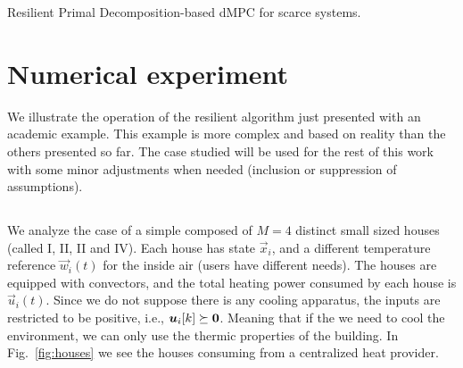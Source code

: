 \documentclass[../main.tex]{subfiles}
\begin{document}
\begin{algorithm2e}[h]
  \DontPrintSemicolon
  \caption{Resilient Primal Decomposition-based dMPC for scarce systems.}\label{alg:rpdbdmpcss}
\end{algorithm2e}

\section{Numerical experiment}\label{sec:numerical-experiment}

We illustrate the operation of the resilient algorithm just presented with an academic example.
This example is more complex and based on reality than the others presented so far.
The case studied will be used for the rest of this work with some minor adjustments when needed (inclusion or suppression of assumptions).

\subsection{\dhnlong}\label{sec:case-study}
We analyze the case of a simple \dhn{} composed of ${M=4}$ distinct small sized houses (called I, II, II and IV).
Each house has state $\vec{x}_{i}$, and a different temperature reference $\vec{w}_{i}(t)$ for the inside air (users have different needs).
The houses are equipped with convectors, and the total heating power consumed by each house is $\vec{u}_{i}(t)$.
Since we do not suppose there is any cooling apparatus, the inputs are restricted to be positive, i.e., $\boldsymbol{u}_{i}[k]\succeq\mathbf{0}$. Meaning that if the we need to cool the environment, we can only use the thermic properties of the building.
In Fig.~\ref{fig:houses} we see the houses consuming from a centralized heat provider.
\end{document}
